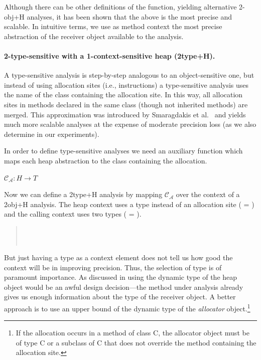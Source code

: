 Although there can be other definitions of the  function, yielding alternative 2-obj+H analyses, it has been shown \cite{popl:2011:Smaragdakis} that the above is the most precise and scalable. In intuitive terms, we use as method context the most precise abstraction of the receiver object available to the analysis.

\paragraph*{2-type-sensitive with a 1-context-sensitive heap (2type+H).}
A type-sensitive analysis is step-by-step analogous to an object-sensitive one, but instead of using allocation sites (i.e., instructions) a type-sensitive analysis uses the name of the class containing the allocation site. In this way, all allocation sites in methods declared in the same class (though not inherited methods) are merged. This approximation was introduced by Smaragdakis et al.~\cite{popl:2011:Smaragdakis} and yields much more scalable analyses at the expense of moderate precision loss (as we also determine in our experiments).

In order to define type-sensitive analyses we need an auxiliary function which maps each heap abstraction to the class containing the allocation.

$\mathcal{C_A}: H \rightarrow T$

Now we can define a 2type+H analysis by mapping $\mathcal{C_A}$ over the context of a 2obj+H analysis. The heap context uses a type instead of an allocation site ( = ) and the calling context uses two types ( = ).

\begin{quote}
 \\
 \\
\end{quote}

But just having a type as a context element does not tell us how good the context will be in improving precision. Thus, the selection of type is of paramount importance. As discussed in \cite{popl:2011:Smaragdakis} using the dynamic type of the heap object would be an awful design decision---the method under analysis already gives us enough information about the type of the receiver object. A better approach is to use an upper bound of the dynamic type of the \emph{allocator} object.\footnote{If the allocation occurs in a method of class C, the allocator object must be of type C or a subclass of C that does not override the method containing the allocation site.}

